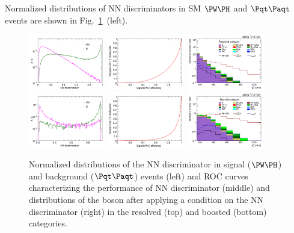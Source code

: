 \documentclass[a4paper,11pt]{article}
\newcommand{\Pt}{{{\Pqt}}\xspace}
\newcommand{\PAt}{{{{\Paqt}}}\xspace}
\begin{document}
Normalized distributions of NN discriminators in SM $\PW\PH$ and $\Pt\PAt$ events are shown in Fig.~\ref{fig:MVA}~(left). 
\begin{figure}[hbtp]
\begin{center}
\includegraphics[width=0.3\textwidth]{Figures/New/RECO/Plot_WH_MVA_WH_fast_resolved.png}
\includegraphics[width=0.3\textwidth]{Figures/New/RECO/ROC_plot_TT_MVA_resolved.png}
\includegraphics[width=0.3\textwidth]{Figures/New/RECO/Plot_Resolved_SR_V_pt_sigpurity.png}
\includegraphics[width=0.3\textwidth]{Figures/New/RECO/Plot_WH_MVA_WH_fast_boosted.png}
\includegraphics[width=0.3\textwidth]{Figures/New/RECO/ROC_plot_TT_MVA_boosted.png}
\includegraphics[width=0.3\textwidth]{Figures/New/RECO/Plot_Boosted_SR_V_pt_sigpurity.png}
\end{center}
\caption{
Normalized distributions of the NN discriminator in signal ($\PW\PH$) and background ($\Pt\PAt$) events (left) and ROC curves characterizing the performance of NN discriminator (middle) and distributions of the \PW boson \pt after applying a condition on the NN discriminator (right) in the resolved (top) and boosted (bottom) categories.
}
\label{fig:MVA}
\end{figure}
\end{document}
